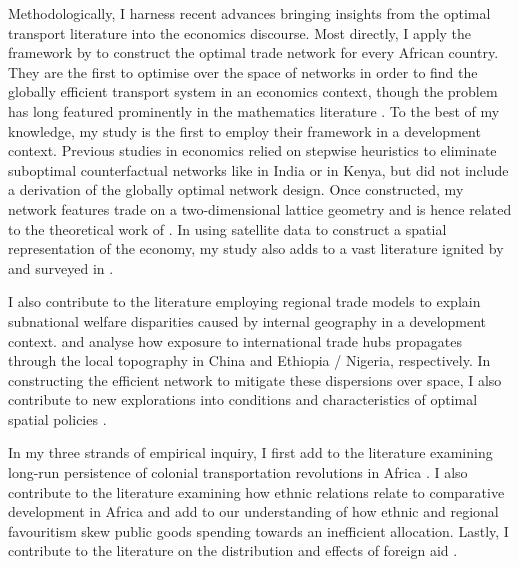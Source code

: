 \documentclass[11pt, oneside]{article}   	%
\begin{document}
Methodologically, I harness recent advances bringing insights from the optimal transport literature into the economics discourse. Most directly, I apply the framework by \cite{Fajgelbaum_OptimalTransportNetworks_2017} to construct the optimal trade network for every African country. They are the first to optimise over the space of networks in order to find the globally efficient transport system in an economics context, though the problem has long featured prominently in the mathematics literature \citep[for a textbook treatment, see][]{Bernot_OptimalTransportationNetworks_2009}. To the best of my knowledge, my study is the first to employ their framework in a development context. Previous studies in economics relied on stepwise heuristics to eliminate suboptimal counterfactual networks like \cite{Alder_ChineseRoadsIndia_2017} in India or \cite{Burgess_ValueDemocracyEvidence_2015} in Kenya, but did not include a derivation of the globally optimal network design. Once constructed, my network features trade on a two-dimensional lattice geometry and is hence related to the theoretical work of \cite{Allen_TradeTopographySpatial_2014,Allen_WelfareEffectsTransportation_2016}. In using satellite data to construct a spatial representation of the economy, my study also adds to a vast literature ignited by \cite{Henderson_MeasuringEconomicGrowth_2012} and surveyed in \cite{donaldson_view_2016}.

I also contribute to the literature employing regional trade models to explain subnational welfare disparities caused by internal geography in a development context. \cite{Cosar_InternalGeographyInternational_2016} and \cite{Atkin_WhoGettingGlobalized_2015} analyse how exposure to international trade hubs propagates through the local topography in China and Ethiopia / Nigeria, respectively. In constructing the efficient network to mitigate these dispersions over space, I also contribute to new explorations into conditions and characteristics of optimal spatial policies \citep{Fajgelbaum_OptimalSpatialPolicies_2018}.

In my three strands of empirical inquiry, I first add to the literature examining long-run persistence of colonial transportation revolutions in Africa \citep{Jedwab_PermanentEffectsTransportation_2016a,Jedwab_HistoryPathDependence_2017a}. I also contribute to the literature examining how ethnic relations relate to comparative development in Africa \citep{Michalopoulos_PreColonialEthnicInstitutions_2013,Michalopoulos_NationalInstitutionsSubnational_2014,Michalopoulos_LongRunEffectsScramble_2016} and add to our understanding of how ethnic \citep{DeLuca_Ethnicfavoritismaxiom_2018} and regional favouritism \citep{Hodler_RegionalFavoritism_2014,Burgess_ValueDemocracyEvidence_2015} skew public goods spending towards an inefficient allocation. Lastly, I contribute to the literature on the distribution and effects of foreign aid \citep{Clemens_CountingChickenswhen_2012,Nunn_USFoodAid_2014,Dreher_Aidgrowthregional_2015,Dreher_AidChinaGrowth_2017}.
\end{document}
